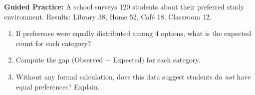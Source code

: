 \documentclass[10pt]{article}
\begin{document}
\begin{practicebox}
\textbf{Guided Practice:} A school surveys 120 students about their preferred study
environment. Results: Library 38, Home 52, Caf\'e 18, Classroom 12.

\begin{enumerate}
  \item If preference were equally distributed among 4 options, what is the
        expected count for each category?
        \ansline{}\\

  \item Compute the gap (Observed $-$ Expected) for each category.
        \\

  \item Without any formal calculation, does this data suggest students do
        \emph{not} have equal preferences? Explain.
        \ansline{}\\
\end{enumerate}
\end{practicebox}
\end{document}
